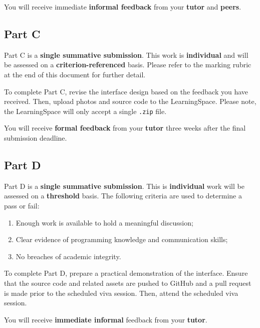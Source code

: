 \documentclass{../../fal_assignment}
\begin{document}
You will receive immediate \textbf{informal feedback} from your \textbf{tutor} and \textbf{peers}.

\subsection*{Part C}

Part C is a \textbf{single summative submission}. This work is \textbf{individual} and will be assessed on a \textbf{criterion-referenced} basis. Please refer to the marking rubric at the end of this document for further detail.

To complete Part C, revise the interface design based on the feedback you have received. Then, upload photos and source code to the LearningSpace. Please note, the LearningSpace will only accept a single \texttt{.zip} file.

You will receive \textbf{formal feedback} from your \textbf{tutor} three weeks after the final submission deadline.

\subsection*{Part D}

Part D is a \textbf{single summative submission}. This is \textbf{individual} work will be assessed on a \textbf{threshold} basis. The following criteria are used to determine a pass or fail: 

\begin{enumerate}[label=(\alph*)]
	\item Enough work is available to hold a meaningful discussion; 
	\item Clear evidence of programming knowledge and communication skills; 
	\item No breaches of academic integrity. 
\end{enumerate}

To complete Part D, prepare a practical demonstration of the interface. Ensure that the source code and related assets are pushed to GitHub and a pull request is made prior to the scheduled viva session. Then, attend the scheduled viva session. 

You will receive \textbf{immediate informal} feedback from your \textbf{tutor}.
\end{document}
